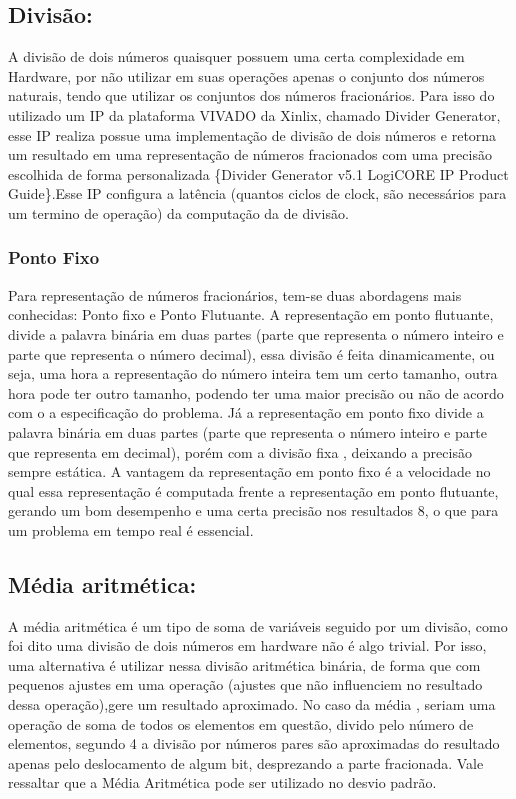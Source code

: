 	\subsection{Divisão:} A divisão de dois números quaisquer possuem uma certa complexidade em Hardware, por não utilizar em suas operações apenas o conjunto dos números naturais, tendo que utilizar os conjuntos dos números fracionários. Para isso do utilizado um IP da plataforma VIVADO da Xinlix, chamado Divider Generator, esse IP realiza possue uma implementação de divisão de dois números e retorna um resultado em uma representação de números fracionados com uma precisão escolhida de forma personalizada \{Divider Generator v5.1 LogiCORE IP Product Guide\}.Esse IP configura a latência (quantos ciclos de clock, são necessários para um termino de operação) da computação da de divisão.
	\subsubsection{Ponto Fixo} 	
	Para representação de números fracionários, tem-se duas abordagens mais conhecidas: Ponto fixo e Ponto Flutuante. A representação em ponto flutuante, divide a palavra binária em duas partes (parte que representa o número inteiro e parte que representa o número decimal), essa divisão é feita dinamicamente, ou seja, uma hora a representação do número inteira tem um certo tamanho, outra hora pode ter outro tamanho, podendo ter uma maior precisão ou não de acordo com o a especificação do problema. Já a representação em ponto fixo divide a palavra binária em duas partes (parte que representa o número inteiro e parte que representa em decimal), porém com a divisão fixa , deixando a precisão sempre estática. A vantagem da representação em ponto fixo é a velocidade no qual essa representação é computada frente a representação em ponto flutuante, gerando um bom desempenho e uma certa precisão nos resultados {8}, o que para um problema em tempo real é essencial.
	
 	\subsection{Média aritmética:}  A média aritmética é um tipo de soma de variáveis seguido por um divisão, como foi dito uma divisão de dois números em hardware não é algo trivial. Por isso, uma alternativa é utilizar nessa divisão aritmética binária, de forma que com pequenos ajustes em uma operação (ajustes que não influenciem no resultado dessa operação),gere um resultado aproximado. No caso da média , seriam uma operação de soma de todos os elementos em questão, divido pelo número de elementos, segundo {4} a divisão por números pares são aproximadas do resultado apenas pelo deslocamento de algum bit, desprezando a parte fracionada. Vale ressaltar que a Média Aritmética pode ser utilizado no desvio padrão.
